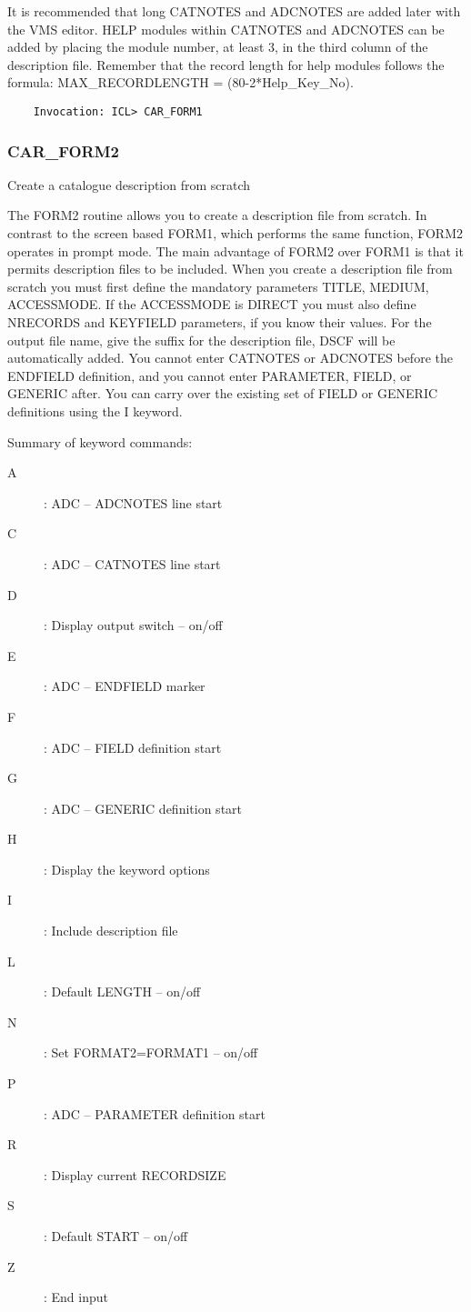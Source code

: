  It is recommended that long CATNOTES and ADCNOTES are added later
with the VMS editor. 
HELP modules within CATNOTES and ADCNOTES can be added by placing the 
module number, at least 3, in the third column of the description file.
Remember that the record length for help modules follows the formula:
MAX\_RECORDLENGTH = (80-2*Help\_Key\_No).
 
\begin{verbatim}
    Invocation: ICL> CAR_FORM1
\end{verbatim}

\subsubsection{CAR\_FORM2}

Create a catalogue description from scratch

The FORM2 routine allows you to create a description file
from scratch. 
In contrast to the screen based FORM1, which performs the same 
function, FORM2 operates in prompt mode. 
The main advantage of FORM2 over FORM1 is that it permits description 
files to be included.
When you create a description file from scratch you must first define
the mandatory parameters TITLE, MEDIUM, ACCESSMODE. 
If the ACCESSMODE is DIRECT you must also define NRECORDS and KEYFIELD 
parameters, if you know their values.
For the output file name, give the suffix for the description file, DSCF
will be automatically added.
You cannot enter CATNOTES or ADCNOTES before the ENDFIELD definition,
and you cannot enter PARAMETER, FIELD, or GENERIC after.
You can carry over the existing set of FIELD or GENERIC definitions using
the I keyword.

Summary of keyword commands:
\begin{description}
\item [A]: ADC -- ADCNOTES line start
\item [C]: ADC -- CATNOTES line start
\item [D]: Display output switch -- on/off
\item [E]: ADC -- ENDFIELD marker
\item [F]: ADC -- FIELD definition start
\item [G]: ADC -- GENERIC definition start
\item [H]: Display the keyword options
\item [I]: Include description file
\item [L]: Default LENGTH -- on/off
\item [N]: Set FORMAT2=FORMAT1 -- on/off
\item [P]: ADC -- PARAMETER definition start
\item [R]: Display current RECORDSIZE
\item [S]: Default START -- on/off
\item [Z]: End input
\end{description}
 
